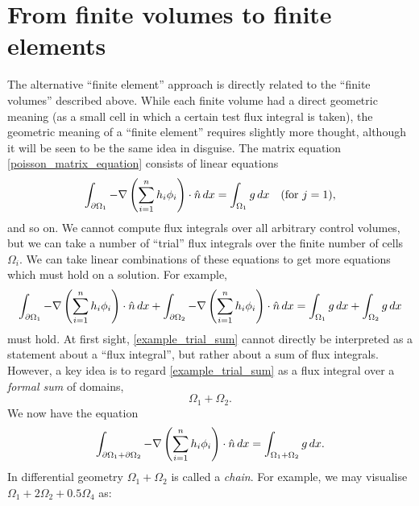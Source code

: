 
\section{From finite volumes to finite elements}\label{trial_function}
The alternative ``finite element'' approach is directly related to the ``finite volumes'' described above. While each finite volume
had a direct geometric meaning (as a small cell in which a certain test flux integral is taken), the geometric meaning of a ``finite element''
requires slightly more thought, although it will be seen to be the same idea in disguise.
The matrix equation \eqref{poisson_matrix_equation} consists of linear equations
\begin{align*}
    \int_{{\partial\Omega}_1} -\nabla \left(\sum_{i=1}^n h_i\phi_i\right) \cdot \hat{n}\,dx
    =
    \int_{{\Omega}_1}g\,dx\quad\text{(for $j=1$)},
\end{align*}
and so on. We cannot compute flux integrals
over all arbitrary control volumes, but we can take a number of ``trial'' flux integrals over the finite number of cells $\Omega_i$.
We can take linear combinations of these equations to get more equations which must hold on a solution.
For example,
\begin{equation}\label{example_trial_sum}
    \int_{{\partial\Omega}_1} -\nabla \left(\sum_{i=1}^n h_i\phi_i\right) \cdot \hat{n}\,dx
    +
    \int_{{\partial\Omega}_2} -\nabla \left(\sum_{i=1}^n h_i\phi_i\right) \cdot \hat{n}\,dx
    =
    \int_{{\Omega}_1}g\,dx
    +
    \int_{{\Omega}_2}g\,dx
\end{equation}
must hold. At first sight, \eqref{example_trial_sum} cannot directly be interpreted as a statement about a ``flux integral'', but rather about a sum
of flux integrals. However, a key idea is to regard \eqref{example_trial_sum} as a flux integral over a \textit{formal sum} of domains,
    $$\Omega_1 + \Omega_2.$$
We now have the equation
\begin{equation}
    \int_{{\partial\Omega}_1 + {\partial\Omega}_2} -\nabla \left(\sum_{i=1}^n h_i\phi_i\right) \cdot \hat{n}\,dx
    =
    \int_{{\Omega}_1 + {\Omega}_2}g\,dx.
\end{equation}
In differential geometry $\Omega_1 + \Omega_2$ is called a \textit{chain}. For example, we may visualise $\Omega_1 + 2\Omega_2 + 0.5\Omega_4$ as:

